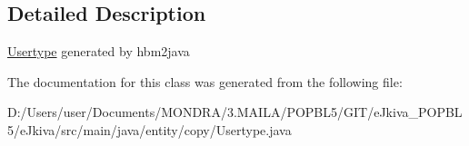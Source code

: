 \subsection{Detailed Description}
\mbox{\hyperlink{classentity_1_1copy_1_1_usertype}{Usertype}} generated by hbm2java 

The documentation for this class was generated from the following file\+:\begin{DoxyCompactItemize}
\item 
D\+:/\+Users/user/\+Documents/\+M\+O\+N\+D\+R\+A/3.\+M\+A\+I\+L\+A/\+P\+O\+P\+B\+L5/\+G\+I\+T/e\+Jkiva\+\_\+\+P\+O\+P\+B\+L5/e\+Jkiva/src/main/java/entity/copy/Usertype.\+java\end{DoxyCompactItemize}
